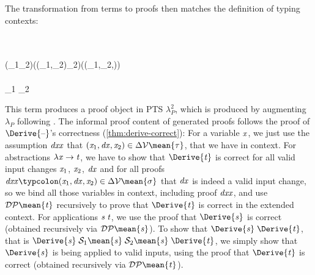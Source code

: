 The transformation from terms to proofs then matches the definition of typing contexts:
\begin{hscode}\SaveRestoreHook
{}%
%
%
%
%
\>[3]{}\mathrel{=}\<[E]%
\\
\>[3]{}\mathrel{=}{}\<[E]%
\\
\>[3]{}\<[5]%
\>[5]{}\lambda (_{1}\;_{2}\typcolon\sigma)\;(\typcolon(_{1},_{2})\in \Delta_2\mean{\sigma})\;(\typcolon(_{1},_{2},)\in \Delta{}\mean{\sigma})\to {}\<[E]%
\\
\>[5]{}\<[7]%
\>[7]{}\<[E]%
\\
\>[3]{}\mathrel{=}\;_1 \;_2 \;\;\<[E]%
\ColumnHook
\end{hscode}\resethooks
This term produces a proof object in PTS \ensuremath{\lambda_P^2}, which is produced by
augmenting \ensuremath{\lambda_P} following \citet{Bernardy2011realizability}.
The informal proof content of generated proofs follows
the proof of \ensuremath{\Derive{\text{\textendash}}}'s correctness (\cref{thm:derive-correct}):
For a variable \ensuremath{\Varid{x}}, we just use the assumption \ensuremath{\Varid{dxx}} that
\ensuremath{(\Varid{x}_{1},\Varid{dx},\Varid{x}_{2})\in \Delta\mathcal{V}\mean{\tau}}, that we have in context.
For abstractions \ensuremath{\lambda \Varid{x}\to \Varid{t}}, we have to show that \ensuremath{\Derive{\Varid{t}}} is correct for all
valid input changes \ensuremath{\Varid{x}_{1}}, \ensuremath{\Varid{x}_{2}}, \ensuremath{\Varid{dx}} and for all proofs \ensuremath{\Varid{dxx}\typcolon(\Varid{x}_{1},\Varid{dx},\Varid{x}_{2})\in \Delta\mathcal{V}\mean{\sigma}} that \ensuremath{\Varid{dx}} is indeed a valid input change, so we bind
all those variables in context, including proof \ensuremath{\Varid{dxx}}, and use \ensuremath{\mathcal{DP}\mean{\Varid{t}}}
recursively to prove that \ensuremath{\Derive{\Varid{t}}} is correct in the extended context.
For applications \ensuremath{\Varid{s}\;\Varid{t}}, we use the proof that \ensuremath{\Derive{\Varid{s}}} is correct (obtained
recursively via \ensuremath{\mathcal{DP}\mean{\Varid{s}}}). To show that \ensuremath{\Derive{\Varid{s}}\;\Derive{\Varid{t}}}, that is
\ensuremath{\Derive{\Varid{s}}\;\mathcal{S}_1 \mean{\Varid{s}}\;\mathcal{S}_2 \mean{\Varid{s}}\;\Derive{\Varid{t}}}, we simply show that \ensuremath{\Derive{\Varid{s}}} is
being applied to valid inputs, using the proof that \ensuremath{\Derive{\Varid{t}}} is correct
(obtained recursively via \ensuremath{\mathcal{DP}\mean{\Varid{t}}}).

